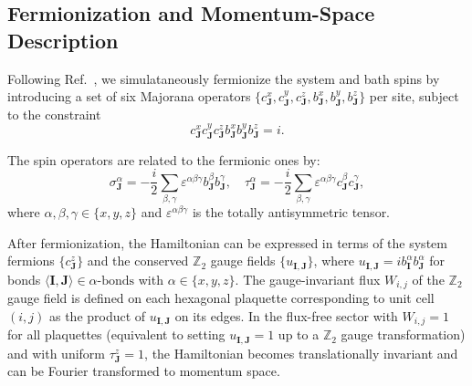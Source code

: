 \documentclass[twocolumn,
aps,
prx,
showpacs,
amsmath,
amssymb,
floatfix,
longbibliography,
superscriptaddress,
eprint]
{revtex4-1}
\begin{document}
\subsection{Fermionization and Momentum-Space Description}

Following Ref.~\cite{Kishony_2025}, we simulataneously fermionize the system and bath spins by introducing a set of six Majorana operators $\{c_{\mathbf{J}}^{x},c_{\mathbf{J}}^{y},c_{\mathbf{J}}^{z},b_{\mathbf{J}}^{x},b_{\mathbf{J}}^{y},b_{\mathbf{J}}^{z}\}$ per site, subject to the constraint
\begin{equation}
c_{\mathbf{J}}^{x}c_{\mathbf{J}}^{y}c_{\mathbf{J}}^{z}b_{\mathbf{J}}^{x}b_{\mathbf{J}}^{y}b_{\mathbf{J}}^{z}=i.
\label{eq:constraint}
\end{equation}

The spin operators are related to the fermionic ones by:
\begin{equation}
\sigma_{\mathbf{J}}^{\alpha}  =-\frac{i}{2}\sum_{\beta,\gamma}\varepsilon^{\alpha\beta\gamma}b_{\mathbf{J}}^{\beta}b_{\mathbf{J}}^{\gamma},\quad
\tau_{\mathbf{J}}^{\alpha}  =-\frac{i}{2}\sum_{\beta,\gamma}\varepsilon^{\alpha\beta\gamma}c_{\mathbf{J}}^{\beta}c_{\mathbf{J}}^{\gamma},
\label{eq: mapping spins to fermions}
\end{equation}
where $\alpha,\beta,\gamma \in \{x,y,z\}$ and $\varepsilon^{\alpha\beta\gamma}$ is the totally antisymmetric tensor.

After fermionization, the Hamiltonian can be expressed in terms of the system fermions $\{c_{\mathbf{J}}^{z}\}$ and the conserved $\mathbb{Z}_2$ gauge fields $\{u_{\mathbf{I},\mathbf{J}}\}$, where $u_{\mathbf{I},\mathbf{J}} = ib_{\mathbf{I}}^{\alpha}b_{\mathbf{J}}^{\alpha}$ for bonds $\langle \mathbf{I},\mathbf{J}\rangle\in \alpha\text{-bonds}$ with $\alpha\in\{x,y,z\}$. The gauge-invariant flux $W_{i,j}$ of the $\mathbb{Z}_2$ gauge field is defined on each hexagonal plaquette corresponding to unit cell $(i,j)$ as the product of $u_{\mathbf{I},\mathbf{J}}$ on its edges. In the flux-free sector with $W_{i,j}=1$ for all plaquettes (equivalent to setting $u_{\mathbf{I},\mathbf{J}}=1$ up to a $\mathbb{Z}_2$ gauge transformation) and with uniform $\tau^z_{\mathbf{J}}=1$, the Hamiltonian becomes translationally invariant and can be Fourier transformed to momentum space.
\end{document}
